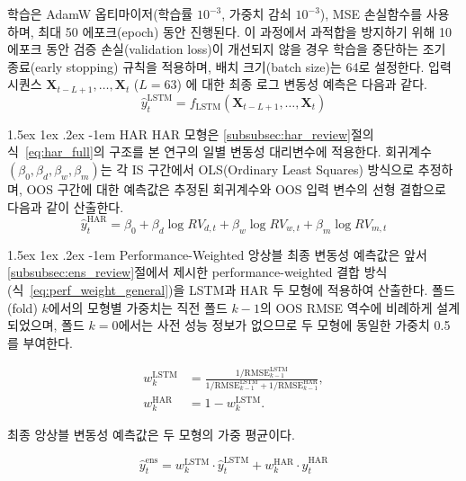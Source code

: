 \documentclass[eng]{kjas3}
\makeatletter
\newcommand\paragraph{\@startsection{paragraph}{4}{\z@}%
    {1.5ex \@plus1ex \@minus.2ex}%
    {-1em}%
    {\normalfont\normalsize\bfseries}}
\makeatother
\begin{document}
학습은 AdamW 옵티마이저(학습률 $10^{-3}$, 가중치 감쇠 $10^{-3}$), MSE 손실함수를 사용하며, 최대 50 에포크(epoch) 동안 진행된다. 이 과정에서 과적합을 방지하기 위해 10 에포크 동안 검증 손실(validation loss)이 개선되지 않을 경우 학습을 중단하는 조기 종료(early stopping) 규칙을 적용하며, 배치 크기(batch size)는 64로 설정한다. 입력 시퀀스 $\mathbf{X}_{t-L+1}, \ldots, \mathbf{X}_t$ ($L=63$) 에 대한 최종 로그 변동성 예측은 다음과 같다.
\begin{equation}
\hat{y}^{\text{LSTM}}_t = f_{\text{LSTM}}(\mathbf{X}_{t-L+1}, \ldots,
\mathbf{X}_t)
\label{eq:lstm_pred}
\end{equation}

\paragraph{HAR}
HAR 모형은 \ref{subsubsec:har_review}절의 식~\ref{eq:har_full}의 구조를 본 연구의 일별 변동성 대리변수에 적용한다. 회귀계수
$(\beta_0, \beta_d, \beta_w, \beta_m)$는 각 IS 구간에서 OLS(Ordinary Least Squares) 방식으로 추정하며, OOS 구간에 대한 예측값은 추정된 회귀계수와 OOS 입력 변수의 선형 결합으로 다음과 같이 산출한다.
\begin{equation}
\hat{y}^{\text{HAR}}_t = \beta_0 + \beta_d \log RV_{d,t} + \beta_w \log
RV_{w,t}+ \beta_m \log RV_{m,t}
\label{eq:har_pred_impl}
\end{equation}

\paragraph{Performance-Weighted 앙상블}
최종 변동성 예측값은 앞서 \ref{subsubsec:ens_review}절에서 제시한 performance-weighted 결합 방식(식~\ref{eq:perf_weight_general})을 LSTM과 HAR 두 모형에 적용하여 산출한다. 폴드(fold) $k$에서의 모형별 가중치는 직전 폴드 $k-1$의 OOS RMSE 역수에 비례하게 설계되었으며, 폴드 $k=0$에서는 사전 성능 정보가 없으므로 두 모형에 동일한 가중치 0.5를 부여한다.

\begin{align}
w_k^{\text{LSTM}} &= \frac{1/\text{RMSE}_{k-1}^{\text{LSTM}}}
{1/\text{RMSE}_{k-1}^{\text{LSTM}} + 1/\text{RMSE}_{k-1}^{\text{HAR}}},
\label{eq:ens_weight_lstm}\\
w_k^{\text{HAR}} &= 1 - w_k^{\text{LSTM}}.
\label{eq:ens_weight_har}
\end{align}

최종 앙상블 변동성 예측값은 두 모형의 가중 평균이다.

\begin{equation}
\hat{y}^{\text{ens}}_t = w_k^{\text{LSTM}} \cdot \hat{y}^{\text{LSTM}}_t
+ w_k^{\text{HAR}} \cdot \hat{y}^{\text{HAR}}_t
\label{eq:ens_pred}
\end{equation}
\end{document}
